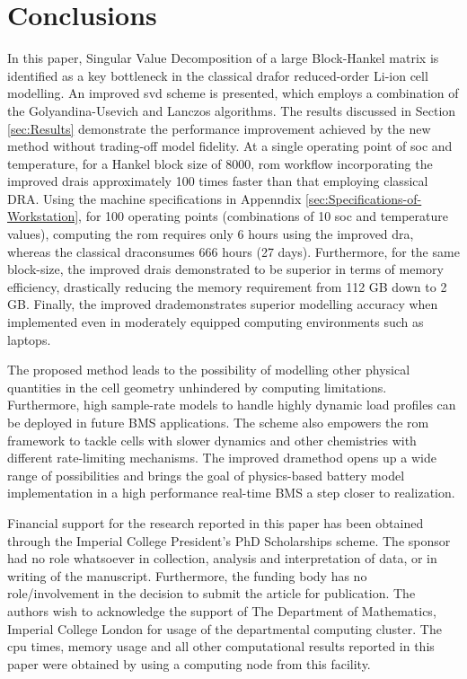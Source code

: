 \section{Conclusions\label{sec:Conclusion}}
In this paper, Singular Value Decomposition of a large Block-Hankel
matrix is identified as a key bottleneck in the classical \gls{dra}for
reduced-order Li-ion cell modelling. An improved \gls{svd} scheme is presented,
which employs a combination of the Golyandina-Usevich and Lanczos
algorithms. The results discussed in Section \ref{sec:Results} demonstrate
the performance improvement achieved by the new method without trading-off
model fidelity. At a single operating point of \gls{soc} and temperature,
for a Hankel block size of 8000, \gls{rom} workflow incorporating the improved
\gls{dra}is approximately 100 times faster than that employing classical
DRA. Using the machine specifications in Appenndix  \ref{sec:Specifications-of-Workstation},
for 100 operating points (combinations of 10 \gls{soc} and temperature values),
computing the \gls{rom} requires only 6 hours using the improved \gls{dra}, whereas
the classical \gls{dra}consumes 666 hours (27 days). Furthermore, for the
same block-size, the improved \gls{dra}is demonstrated to be superior in
terms of memory efficiency, drastically reducing the memory requirement
from 112 GB down to 2 GB. Finally, the improved \gls{dra}demonstrates superior
modelling accuracy when implemented even in moderately equipped computing
environments such as laptops.

The proposed method leads to the possibility of modelling other physical
quantities in the cell geometry unhindered by computing limitations.
Furthermore, high sample-rate models to handle highly dynamic load
profiles can be deployed in future BMS applications. The scheme also
empowers the \gls{rom} framework to tackle cells with slower dynamics and
other chemistries with different rate-limiting mechanisms. The improved
\gls{dra}method opens up a wide range of possibilities and brings the goal
of physics-based battery model implementation in a high performance
real-time BMS a step closer to realization.

\begin{acknowledgment}
    Financial support for the research reported in this paper has been
    obtained through the Imperial College President's PhD Scholarships
    scheme. The sponsor had no role whatsoever in collection, analysis
    and interpretation of data, or in writing of the manuscript. Furthermore,
    the funding body has no role/involvement in the decision to submit
    the article for publication. The authors wish to acknowledge the support
    of The Department of Mathematics, Imperial College London for usage
    of the departmental computing cluster. The \gls{cpu} times, memory usage
    and all other computational results reported in this paper were obtained
    by using a computing node from this facility.
\end{acknowledgment}

